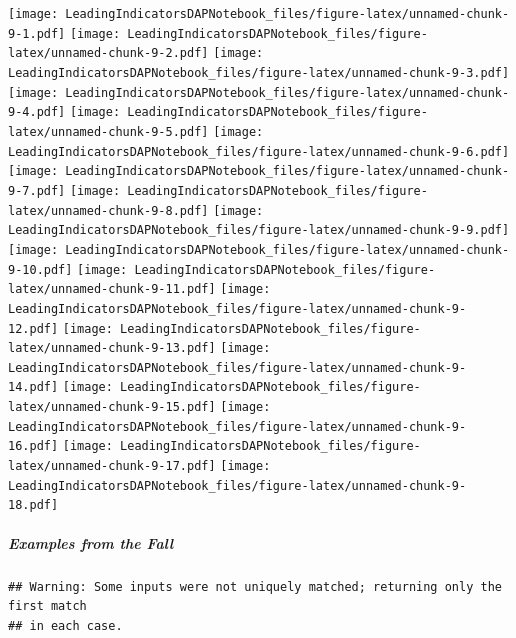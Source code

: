 \documentclass[]{article}
\let\oldsubparagraph\subparagraph
\renewcommand{\subparagraph}[1]{\oldsubparagraph{#1}\mbox{}}
\begin{document}
\texttt{[image: LeadingIndicatorsDAPNotebook\_files/figure-latex/unnamed-chunk-9-1.pdf]}
\texttt{[image: LeadingIndicatorsDAPNotebook\_files/figure-latex/unnamed-chunk-9-2.pdf]}
\texttt{[image: LeadingIndicatorsDAPNotebook\_files/figure-latex/unnamed-chunk-9-3.pdf]}
\texttt{[image: LeadingIndicatorsDAPNotebook\_files/figure-latex/unnamed-chunk-9-4.pdf]}
\texttt{[image: LeadingIndicatorsDAPNotebook\_files/figure-latex/unnamed-chunk-9-5.pdf]}
\texttt{[image: LeadingIndicatorsDAPNotebook\_files/figure-latex/unnamed-chunk-9-6.pdf]}
\texttt{[image: LeadingIndicatorsDAPNotebook\_files/figure-latex/unnamed-chunk-9-7.pdf]}
\texttt{[image: LeadingIndicatorsDAPNotebook\_files/figure-latex/unnamed-chunk-9-8.pdf]}
\texttt{[image: LeadingIndicatorsDAPNotebook\_files/figure-latex/unnamed-chunk-9-9.pdf]}
\texttt{[image: LeadingIndicatorsDAPNotebook\_files/figure-latex/unnamed-chunk-9-10.pdf]}
\texttt{[image: LeadingIndicatorsDAPNotebook\_files/figure-latex/unnamed-chunk-9-11.pdf]}
\texttt{[image: LeadingIndicatorsDAPNotebook\_files/figure-latex/unnamed-chunk-9-12.pdf]}
\texttt{[image: LeadingIndicatorsDAPNotebook\_files/figure-latex/unnamed-chunk-9-13.pdf]}
\texttt{[image: LeadingIndicatorsDAPNotebook\_files/figure-latex/unnamed-chunk-9-14.pdf]}
\texttt{[image: LeadingIndicatorsDAPNotebook\_files/figure-latex/unnamed-chunk-9-15.pdf]}
\texttt{[image: LeadingIndicatorsDAPNotebook\_files/figure-latex/unnamed-chunk-9-16.pdf]}
\texttt{[image: LeadingIndicatorsDAPNotebook\_files/figure-latex/unnamed-chunk-9-17.pdf]}
\texttt{[image: LeadingIndicatorsDAPNotebook\_files/figure-latex/unnamed-chunk-9-18.pdf]}

\hypertarget{examples-from-the-fall}{%
\subparagraph{Examples from the Fall}\label{examples-from-the-fall}}

\begin{verbatim}
## Warning: Some inputs were not uniquely matched; returning only the first match
## in each case.
\end{verbatim}
\end{document}

